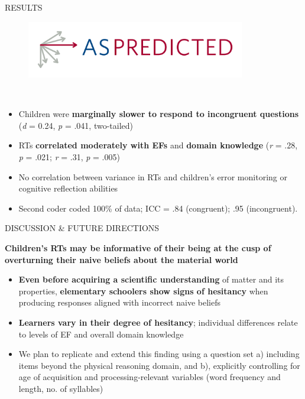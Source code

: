 \documentclass[final]{beamer}
\newlength{\colwidth}
\newlength{\widecolwidth}
\begin{document}
\begin{frame}[t]
\begin{columns}[t]
\begin{column}{\widecolwidth}
\begin{block}{RESULTS}
\begin{minipage}{0.45\textwidth}
\begin{figure}
      \href{https://aspredicted.org/DJG_YWR}{\includegraphics[height=2.5cm]{images/aspredicted.png}}\\[2ex]
\end{figure}
\\[2ex]
    \begin{itemize}
        \item Children were \textbf{marginally slower to respond to incongruent questions} (\emph{d}  = 0.24, \emph{p} = .041, two-tailed)
        \item RTs \textbf{correlated moderately with EFs} and \textbf{domain knowledge} (\emph{r} = .28, \emph{p} = .021; \emph{r} = .31, \emph{p} = .005)
        \item No correlation between variance in RTs and children's error monitoring or cognitive reflection abilities
        \item Second coder coded 100\% of data; ICC = .84 (congruent); .95 (incongruent).
    \end{itemize}
\end{minipage}
\end{block}
    
\begin{block}{DISCUSSION \& FUTURE DIRECTIONS}
	\begin{tcolorbox}[
		colback=mycolor,
		colframe=mycolor,
		coltext=white,
		boxsep=2pt,
		left=2mm,
		right=2mm,
		top=2mm,
		bottom=2mm,
		arc=5mm,
		auto outer arc,
		boxrule=4pt,
		width=\dimexpr\linewidth-2\fboxsep\relax,
		]
		\centering
		\textbf{Children's RTs may be informative of their being at the cusp of overturning their naive beliefs about the material world}
	\end{tcolorbox}
	
    \begin{itemize}
      \item \textbf{Even before acquiring a scientific understanding} of matter and its properties, \textbf{elementary schoolers show signs of hesitancy} when producing responses aligned with incorrect naive beliefs
      \item \textbf{Learners vary in their degree of hesitancy}; individual differences relate to levels of EF and overall domain knowledge
      \item We plan to replicate and extend this finding using a question set a) including items beyond the physical reasoning domain, and b), explicitly controlling for age of acquisition and processing-relevant variables (word frequency and length, no. of syllables)
    \end{itemize}
\end{block}


\end{column}
\end{columns}
\end{frame}
\end{document}
